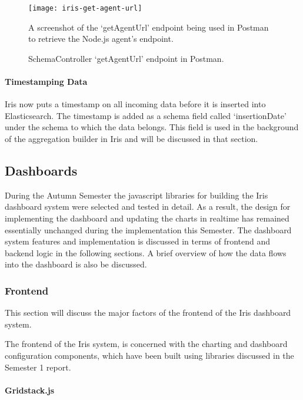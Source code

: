 \documentclass[12pt,a4paper,titlepage]{report}
\begin{document}
\begin{figure}[H]
\begin{tcolorbox}
\begin{center}
\texttt{[image: iris-get-agent-url]}
\end{center}
A screenshot of the `getAgentUrl' endpoint being used in Postman to retrieve the Node.js agent's endpoint.
\end{tcolorbox}
\caption{SchemaController `getAgentUrl' endpoint in Postman.}
\end{figure}

\paragraph{Timestamping Data}
Iris now puts a timestamp on all incoming data before it is inserted into Elasticsearch. The timestamp is added as a schema field called `insertionDate' under the schema to which the data belongs. This field is used in the background of the aggregation builder in Iris and will be discussed in that section.

\subsection{Dashboards}

During the Autumn Semester the javascript libraries for building the Iris dashboard system were selected and tested in detail. As a result, the design for implementing the dashboard and updating the charts in realtime has remained essentially  unchanged during the implementation this Semester. The dashboard system features and implementation is discussed in terms of frontend and backend logic in the following sections. A brief overview of how the data flows into the dashboard is also be discussed.
 
\subsubsection{Frontend}
This section will discuss the major factors of the frontend of the Iris dashboard system.

The frontend of the Iris system, is concerned with the charting and dashboard configuration components, which have been built using libraries discussed in the Semester 1 report.

\paragraph{Gridstack.js}
\end{document}
